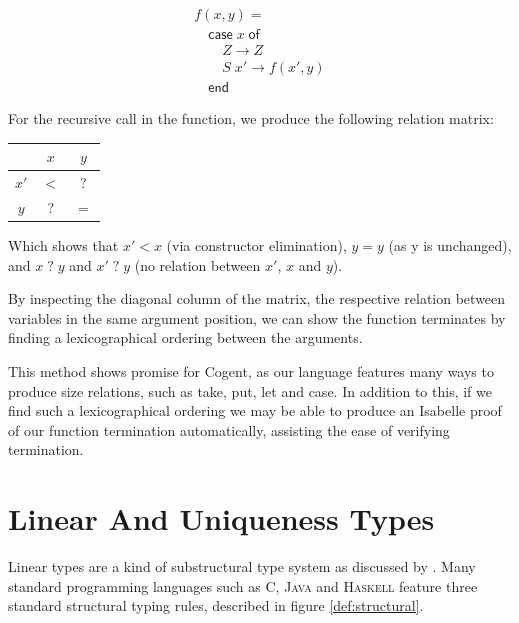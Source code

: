 \[
    \begin{array}{l}
    f(x,y) = \\
    \hspace{1em} \textsf{case}\; x\; \textsf{of} \\
    \hspace{2em}    Z    \rightarrow Z \\
    \hspace{2em}    S\; x' \rightarrow f(x',y) \\
    \hspace{1em} \textsf{end}
    \end{array}
\]

For the recursive call in the function, we produce the following relation matrix:

\begin{center}
    \begin{tabular}{c|cc}
             & $x$        & $y$ \\
        \hline
        $x'$ & $<$        & \textsf{?} \\
        $y$  & \textsf{?} & $=$ \\
    \end{tabular}
\end{center}

Which shows that $x' < x$ (via constructor elimination), $y = y$ (as y is unchanged),
and $x\; \textsf{?}\; y$ and $x'\; \textsf{?}\; y$ (no relation between $x'$, $x$ and $y$).

By inspecting the diagonal column of the matrix, the respective relation between variables
in the same argument position, we can show the function terminates by finding
a lexicographical ordering between the arguments.

This method shows promise for Cogent, as our language features many ways to produce
size relations, such as \textsf{take}, \textsf{put}, \textsf{let} and \textsf{case}.
In addition to this, if we find such a lexicographical ordering we may be able
to produce an Isabelle proof of our function termination automatically,
assisting the ease of verifying termination.

\section{Linear And Uniqueness Types}

Linear types are a kind of substructural type system as discussed by \citet{Substructural}.
Many standard programming languages such as \textsc{C}, \textsc{Java} and \textsc{Haskell} feature
three standard structural typing rules, described in figure \autoref{def:structural}.

